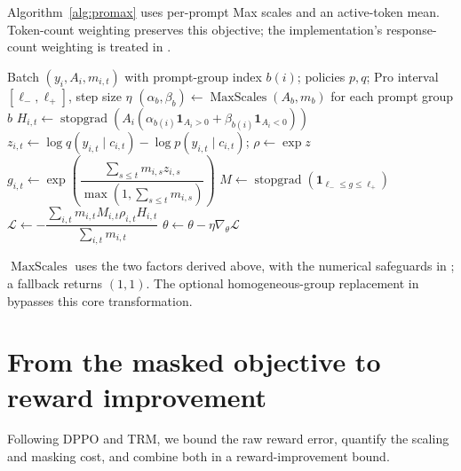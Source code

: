 Algorithm~\ref{alg:promax} uses per-prompt Max scales and an active-token mean.
Token-count weighting preserves this objective; the implementation's
response-count weighting is treated in .

\begin{algorithm}[t]
\caption{REINFORCE Pro Max: core transformations.}
\label{alg:promax}
\begin{algorithmic}[1]
\REQUIRE Batch $(y_i,A_i,m_{i,t})$ with prompt-group index $b(i)$; policies $p,q$;
Pro interval $[\ell_-,\ell_+]$, step size $\eta$
\STATE $(\alpha_b,\beta_b)\leftarrow\operatorname{MaxScales}(A_b,m_b)$ for each prompt group $b$
\STATE $H_{i,t}\leftarrow\operatorname{stopgrad}\!\left(A_i(\alpha_{b(i)}\mathbf1_{A_i>0}+\beta_{b(i)}\mathbf1_{A_i<0})\right)$ 
\STATE $z_{i,t}\leftarrow\log q(y_{i,t}\mid c_{i,t})-\log p(y_{i,t}\mid c_{i,t})$; $\rho\leftarrow\exp z$
\STATE $g_{i,t}\leftarrow\exp\!\left(\dfrac{\sum_{s\le t}m_{i,s}z_{i,s}}{\max(1,\sum_{s\le t}m_{i,s})}\right)$
\STATE $M\leftarrow\operatorname{stopgrad}(\mathbf1_{\ell_-\le g\le\ell_+})$ 
\STATE $\mathcal L\leftarrow-\dfrac{\sum_{i,t}m_{i,t}M_{i,t}\rho_{i,t}H_{i,t}}{\sum_{i,t}m_{i,t}}$
\STATE $\theta\leftarrow\theta-\eta\nabla_\theta\mathcal L$
\end{algorithmic}
\end{algorithm}

$\operatorname{MaxScales}$ uses the two factors derived above, with the
numerical safeguards in ; a fallback
returns $(1,1)$. The optional homogeneous-group replacement in
 bypasses this core transformation.

\section{From the masked objective to reward improvement}
Following DPPO and TRM, we bound the raw reward error, quantify the
scaling and masking cost, and combine both in a reward-improvement bound.

